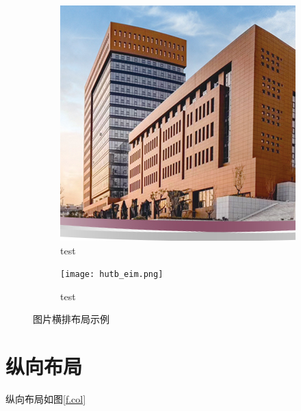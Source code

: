 \begin{figure}[!htb]
\begin{subfigure}[t]{0.24\linewidth}
\begin{minipage}[b]{1\linewidth}
        \includegraphics[width=1\linewidth]{hutb_building.png}
        \caption{test}
        \end{minipage}
    \end{subfigure}
    \begin{subfigure}[t]{0.24\linewidth}
        \begin{minipage}[b]{1\linewidth}
        \texttt{[image: hutb\_eim.png]}
        \caption{test}
        \end{minipage}
    \end{subfigure}
    \caption{图片横排布局示例}
    \label{f.row}
\end{figure}

\section{纵向布局}

纵向布局如图\ref{f.col}


